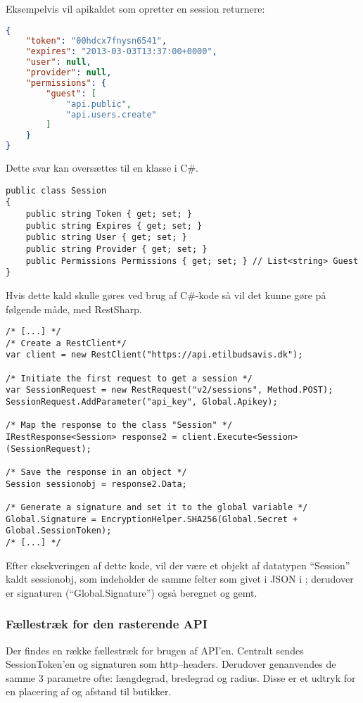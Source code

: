 Eksempelvis vil apikaldet som opretter en session returnere:
\begin{lstlisting}[language=json,firstnumber=1,caption="POST til sessions api'en med APIKEYen",label=apilst1]
{
    "token": "00hdcx7fnysn6541",
    "expires": "2013-03-03T13:37:00+0000",
    "user": null,
    "provider": null,
    "permissions": {
        "guest": [
            "api.public",
            "api.users.create"
        ]
    }
}
\end{lstlisting}

Dette svar kan oversættes til en klasse i C\#.
\begin{lstlisting}[caption="Klassen ``Session'' som svarer til retur JSONet sendt fra /v2/sessions' APIet"]
public class Session
{
    public string Token { get; set; }
    public string Expires { get; set; }
    public string User { get; set; }
    public string Provider { get; set; }
    public Permissions Permissions { get; set; } // List<string> Guest
}
\end{lstlisting}

Hvis dette kald skulle gøres ved brug af C\#-kode så vil det kunne gøre på følgende måde, med RestSharp.
\begin{lstlisting}[caption="C\#-kode som opretter en RestClient og anvender den til at oprette et objekt med felter som svarer til JSON dataet givet fra API'en"]
/* [...] */
/* Create a RestClient*/
var client = new RestClient("https://api.etilbudsavis.dk");

/* Initiate the first request to get a session */
var SessionRequest = new RestRequest("v2/sessions", Method.POST);
SessionRequest.AddParameter("api_key", Global.Apikey);

/* Map the response to the class "Session" */
IRestResponse<Session> response2 = client.Execute<Session>(SessionRequest);

/* Save the response in an object */
Session sessionobj = response2.Data;

/* Generate a signature and set it to the global variable */
Global.Signature = EncryptionHelper.SHA256(Global.Secret + Global.SessionToken);
/* [...] */
\end{lstlisting}
Efter eksekveringen af dette kode, vil der være et objekt af datatypen ``Session'' kaldt sessionobj, som indeholder de samme felter som givet i JSON i ; derudover er signaturen (``Global.Signature'') også beregnet og gemt.

\subsubsection{Fællestræk for den rasterende API}
Der findes en række fællestræk for brugen af API'en.
Centralt sendes SessionToken'en og signaturen som http--headers.
Derudover genanvendes de samme 3 parametre ofte: længdegrad, bredegrad og radius.
Disse er et udtryk for en placering af og afstand til butikker.


